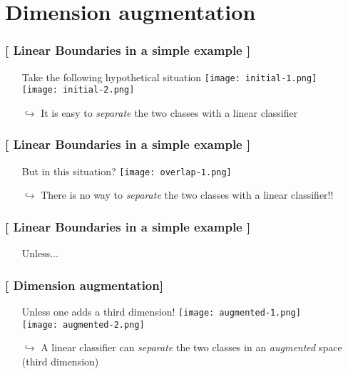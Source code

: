 \documentclass[xcolor=x11names,compress, handhouts]{beamer}
\renewcommand{\(}{\begin{columns}}
\renewcommand{\)}{\end{columns}}
\newcommand{\<}[1]{\begin{column}{#1}}
\renewcommand{\>}{\end{column}}
\begin{document}
\section{Dimension augmentation}

\begin{frame}
\frametitle{\textcolor{brique}{[ Linear Boundaries in a simple example ]}}
\pause
\begin{itemize}[<+->]
    \item[] Take the following hypothetical situation
      {\texttt{[image: initial-1.png]} \\ }
      {\texttt{[image: initial-2.png]} \\ }
    \item[$\hookrightarrow$] It is easy to \textit{separate} the two classes with a linear  classifier
\end{itemize}
\end{frame}

\begin{frame}
\frametitle{\textcolor{brique}{[ Linear Boundaries in a simple example ]}}
\pause
\begin{itemize}[<+->]
    \item[] But in this  situation?
      {\texttt{[image: overlap-1.png]} \\ }
    \item[$\hookrightarrow$] There is no way to  \textit{separate} the two classes with a linear  classifier!!
\end{itemize}
\end{frame}


\begin{frame} %
\frametitle{\textcolor{brique}{[ Linear Boundaries in a simple example ]}}
\pause
\begin{itemize}[<+->]
  \item[] \begin{center} \huge Unless... \end{center}
\end{itemize}
\end{frame}

\begin{frame}
\frametitle{\textcolor{brique}{[ Dimension augmentation]}}
\pause
\begin{itemize}[<+->]
    \item[] Unless  one adds a third dimension!
      {\texttt{[image: augmented-1.png]} \\ }
      {\texttt{[image: augmented-2.png]} \\ }
    \item[$\hookrightarrow$] A  linear classifier can \textit{separate} the two classes  in an \textit{augmented} space (third dimension)
\end{itemize}
\end{frame}
\end{document}
